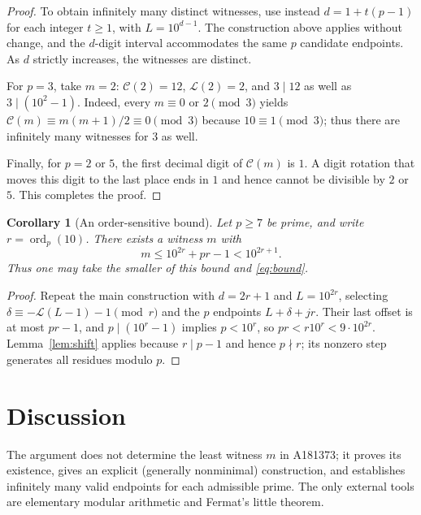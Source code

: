 \documentclass[10pt]{article}
\newtheorem{corollary}{Corollary}
\newcommand{\ord}{\operatorname{ord}}
\newcommand{\Cham}{\mathcal{C}}
\newcommand{\len}{\mathcal{L}}
\begin{document}
\begin{proof}
To obtain infinitely many distinct witnesses, use instead
$d=1+t(p-1)$ for each integer $t\ge1$, with $L=10^{d-1}$.
The construction above applies without change, and the $d$-digit
interval accommodates the same $p$ candidate endpoints.
As $d$ strictly increases, the witnesses are distinct.

For $p=3$, take $m=2$: $\Cham(2)=12$, $\len(2)=2$,
and $3\mid12$ as well as $3\mid(10^2-1)$.
Indeed, every $m\equiv0$ or $2\pmod3$ yields
$\Cham(m)\equiv m(m+1)/2\equiv0\pmod3$ because $10\equiv1\pmod3$;
thus there are infinitely many witnesses for $3$ as well.

Finally, for $p=2$ or $5$, the first decimal digit of $\Cham(m)$
is $1$. A digit rotation that moves this digit to the last place
ends in $1$ and hence cannot be divisible by $2$ or $5$.
This completes the proof.
\end{proof}

\begin{corollary}[An order-sensitive bound]\label{cor:order}
Let $p\ge7$ be prime, and write $r=\ord_p(10)$. There exists a
witness $m$ with
\[
  m\le10^{2r}+pr-1<10^{2r+1}.
\]
Thus one may take the smaller of this bound and \eqref{eq:bound}.
\end{corollary}
\begin{proof}
Repeat the main construction with $d=2r+1$ and $L=10^{2r}$,
selecting $\delta\equiv-\len(L-1)-1\pmod r$ and the $p$ endpoints
$L+\delta+jr$. Their last offset is at most $pr-1$, and
$p\mid(10^r-1)$ implies $p<10^r$, so
$pr<r10^r<9\cdot10^{2r}$. Lemma~\ref{lem:shift}
applies because $r\mid p-1$ and hence $p\nmid r$; its
nonzero step generates all residues modulo $p$.
\end{proof}

\section{Discussion}
The argument does not determine the least witness $m$ in A181373;
it proves its existence, gives an explicit (generally nonminimal)
construction, and establishes infinitely many valid endpoints for
each admissible prime. The only external tools are elementary
modular arithmetic and Fermat's little theorem.
\end{document}
